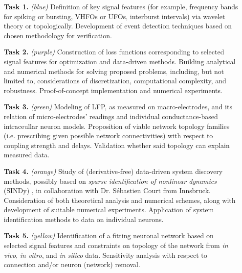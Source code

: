 \documentclass[a4paper,11pt]{scrartcl}
\begin{document}
\begin{itemize}
    \item[\textbf{Task 1.}] \textit{(blue)} Definition of key signal features (for example, frequency bands for spiking or bursting, VHFOs or \acp{UFO}, interburst intervals) via wavelet theory or topologically. Development of event detection techniques based on chosen methodology for verification.
    
    \item[\textbf{Task 2.}] \textit{(purple)} Construction of loss functions corresponding to selected signal features for optimization and data-driven methods. Building analytical and numerical methods for solving proposed problems, including, but not limited to, considerations of discretization, computational complexity, and robustness. Proof-of-concept implementation and numerical experiments.

    \item[\textbf{Task 3.}] \textit{(green)} Modeling of LFP, as measured \cite{Brazdil2017} on macro-electrodes, and its relation of micro-electrodes' readings and individual conductance-based intraceullar neuron models. Proposition of viable network topology families (i.e. prescribing given possible network connectivities) with respect to coupling strength and delays. Validation whether said topology can explain measured data.
    
    \item[\textbf{Task 4.}] \textit{(orange)} Study of (derivative-free) data-driven system discovery methods, possibly based on \textit{sparse identification of nonlinear dynamics} (SINDy) \cite{Brunton2016}, in collaboration with Dr. Sébastien Court from Innsbruck. Consideration of both theoretical analysis and numerical schemes, along with development of suitable numerical experiments. Application of system identification methods to data on individual neurons.

    \item[\textbf{Task 5.}] \textit{(yellow)} Identification of a fitting neuronal network based on selected signal features and constraints on topology of the network from \textit{in vivo}, \textit{in vitro}, and \textit{in silico} data. Sensitivity analysis with respect to connection and/or neuron (network) removal.

\end{itemize}
\end{document}
